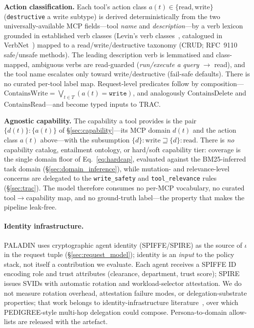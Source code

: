 \documentclass[sigconf,review,anonymous]{acmart}
\begin{document}
\textbf{Action classification.} Each tool's action class $a(t)\in\{\textrm{read},\textrm{write}\}$ (\texttt{destructive} a write subtype) is derived deterministically from the two universally-available MCP fields---tool \emph{name} and \emph{description}---by a verb lexicon grounded in established verb classes (Levin's verb classes~\cite{levin1993verbs}, catalogued in VerbNet~\cite{schuler2005verbnet}) mapped to a read/write/destructive taxonomy (CRUD; RFC~9110 safe/unsafe methods). The leading description verb is lemmatised and class-mapped, ambiguous verbs are read-guarded (\emph{run/execute a query} $\to$ read), and the tool name escalates only toward write/destructive (fail-safe defaults). There is no curated per-tool label map. Request-level predicates follow by composition---$\text{ContainsWrite} = \bigvee_{t \in T} (a(t)=\texttt{write})$, and analogously $\text{ContainsDelete}$ and $\text{ContainsRead}$---and become typed inputs to TRAC.

\textbf{Agnostic capability.} The capability a tool provides is the pair $\{d(t)\}{:}\{a(t)\}$ of \S\ref{sec:capability}---its MCP domain $d(t)$ and the action class $a(t)$ above---with the subsumption $\{d\}{:}\textrm{write}\sqsupseteq\{d\}{:}\textrm{read}$. There is \emph{no} capability catalog, entailment ontology, or hard/soft capability tier: coverage is the single domain floor of Eq.~\ref{eq:hardcap}, evaluated against the BM25-inferred task domain (\S\ref{sec:domain_inference}), while mutation- and relevance-level concerns are delegated to the \texttt{write\_safety} and \texttt{tool\_relevance} rules (\S\ref{sec:trac}). The model therefore consumes no per-MCP vocabulary, no curated tool$\to$capability map, and no ground-truth label---the property that makes the pipeline leak-free.

\paragraph{Identity infrastructure.} PALADIN uses cryptographic agent identity (SPIFFE/SPIRE) as the source of $\iota$ in the request tuple (\S\ref{sec:request_model}); identity is an \emph{input} to the policy stack, not itself a contribution we evaluate. Each agent receives a SPIFFE ID encoding role and trust attributes (clearance, department, trust score); SPIRE issues SVIDs with automatic rotation and workload-selector attestation. We do not measure rotation overhead, attestation failure modes, or delegation-substrate properties; that work belongs to identity-infrastructure literature~\cite{rampalli2026pedigree,south2025authenticated}, over which PEDIGREE-style multi-hop delegation could compose. Persona-to-domain allow-lists are released with the artefact.
\end{document}
